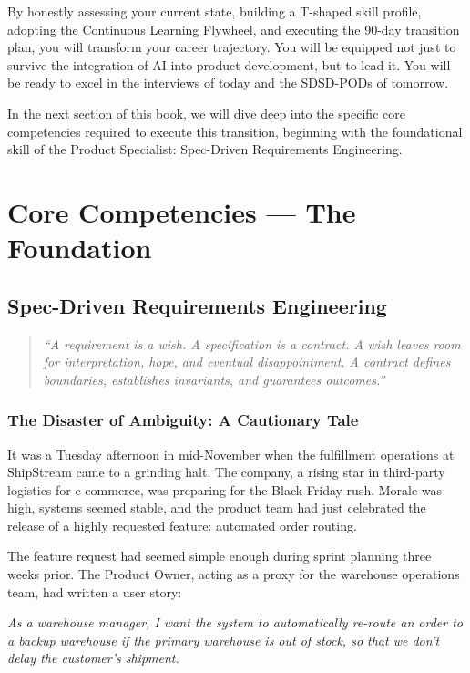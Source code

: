 By honestly assessing your current state, building a T-shaped skill
profile, adopting the Continuous Learning Flywheel, and executing the
90-day transition plan, you will transform your career trajectory. You
will be equipped not just to survive the integration of AI into product
development, but to lead it. You will be ready to excel in the
interviews of today and the SDSD-PODs of tomorrow.

In the next section of this book, we will dive deep into the specific
core competencies required to execute this transition, beginning with
the foundational skill of the Product Specialist: Spec-Driven
Requirements Engineering.

\part{Core Competencies --- The Foundation}

\chapter{Spec-Driven Requirements
Engineering}\label{spec-driven-requirements-engineering}

\begin{quote}
\emph{``A requirement is a wish. A specification is a contract. A wish
leaves room for interpretation, hope, and eventual disappointment. A
contract defines boundaries, establishes invariants, and guarantees
outcomes.''}
\end{quote}

\section{The Disaster of Ambiguity: A Cautionary
Tale}\label{the-disaster-of-ambiguity-a-cautionary-tale}

It was a Tuesday afternoon in mid-November when the fulfillment
operations at ShipStream came to a grinding halt. The company, a rising
star in third-party logistics for e-commerce, was preparing for the
Black Friday rush. Morale was high, systems seemed stable, and the
product team had just celebrated the release of a highly requested
feature: automated order routing.

The feature request had seemed simple enough during sprint planning
three weeks prior. The Product Owner, acting as a proxy for the
warehouse operations team, had written a user story:

\emph{As a warehouse manager, I want the system to automatically
re-route an order to a backup warehouse if the primary warehouse is out
of stock, so that we don't delay the customer's shipment.}

